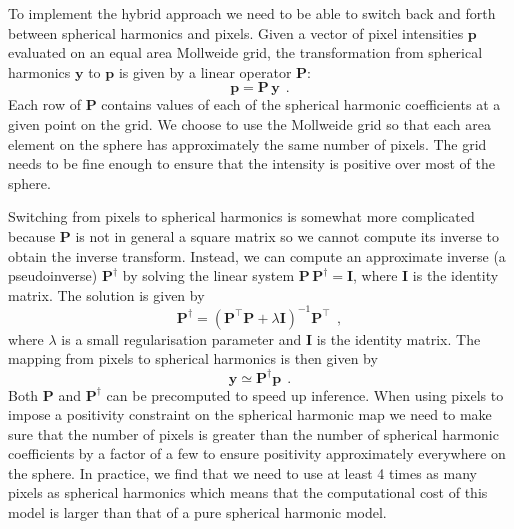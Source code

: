 \documentclass[12pt,dvipsnames]{report}
\newcommand{\hquad}{~~}
\begin{document}
To implement the hybrid approach we need to be able to switch back and forth between spherical harmonics and pixels.
Given a vector of pixel intensities $\mathbf{p}$ evaluated on an equal area Mollweide grid, the transformation from spherical harmonics $\mathbf{y}$ to $\mathbf{p}$ is given by a linear operator $\mathbf{P}$:
\begin{equation}
    \mathbf{p}=\mathbf{P}\,\mathbf{y}
    \hquad.
    \label{eq:ylms_to_pixels}
\end{equation}
Each row of $\mathbf{P}$ contains values of each of the spherical harmonic coefficients at a given point on the grid. 
We choose to use the Mollweide grid so that each area element on the sphere has approximately the same number of pixels.
The grid needs to be fine enough to ensure that the intensity is positive over most of the sphere.

Switching from pixels to spherical harmonics is somewhat more complicated because $\mathbf{P}$ is not in general a square matrix so we cannot compute its inverse to obtain the inverse transform.
Instead, we can compute an approximate inverse (a pseudoinverse) $\mathbf{P}^\dagger$ by solving the linear system $\mathbf{P}\,\mathbf{P}^\dagger=\mathbf{I}$, where $\mathbf{I}$ is the identity matrix. 
The solution is given by
\begin{equation}
\mathbf{P}^\dagger=\left(\mathbf{P}^{\top} \mathbf{P}+\lambda \mathbf{I}\right)^{-1} \mathbf{P}^{\top}
    \hquad,
\end{equation}
where $\lambda$ is a small regularisation parameter and $\mathbf{I}$ is the identity matrix.
The mapping from pixels to spherical harmonics is then given by
\begin{equation}
    \mathbf{y}\simeq\mathbf{P}^\dagger\mathbf{p}
    \hquad.
    \label{eq:pixels_to_ylms}
\end{equation}
Both $\mathbf{P}$ and $\mathbf{P}^\dagger$ can be precomputed to speed up inference.
When using pixels to impose a positivity constraint on the spherical harmonic map we 
need to make sure that the number of pixels is greater than the number of spherical 
harmonic coefficients by a factor of a few to ensure positivity approximately everywhere 
on the sphere.
In practice, we find that we need to use at least 4 times as many pixels as spherical 
harmonics which means that the computational cost of this model is larger than that of a 
pure spherical harmonic model. 
\end{document}
